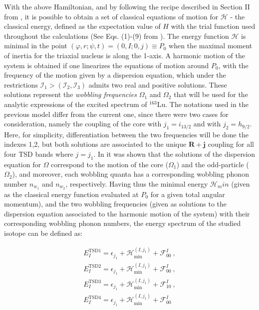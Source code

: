 \documentclass[%
 reprint,
 amsmath,
 amssymb,
 aps,
 floatfix,
]{revtex4-2}
\begin{document}
With the above Hamiltonian, and by following the recipe described in Section II from \cite{raduta2020new}, it is possible to obtain a set of classical equations of motion for $\mathcal{H}$ - the classical energy, defined as the expectation value of $H$ with the trial function used throughout the calculations (See Eqs. (1)-(9) from \cite{raduta2020new}). The energy function $\mathcal{H}$ is minimal in the point $(\varphi,r;\psi,t)=(0,I;0,j)\equiv P_0$ when the maximal moment of inertia for the triaxial nucleus is along the 1-axis. A harmonic motion of the system is obtained if one linearizes the equations of motion around $P_0$, with the frequency of the motion given by a dispersion equation, which under the restrictions $\mathcal{I}_1>(\mathcal{I}_2,\mathcal{I_3})$ admits two real and positive solutions. These solutions represent the \emph{wobbling frequencies} $\Omega_1$ and $\Omega_2$ that will be used for the analytic expressions of the excited spectrum of $^{163}$Lu. The notations used in the previous model differ from the current one, since there were two cases for consideration, namely the coupling of the core with $j_1=i_{13/2}$ and with $j_2=h_{9/2}$. Here, for simplicity, differentiation between the two frequencies will be done the indexes 1,2, but both solutions are associated to the unique $\mathbf{R}+\mathbf{j}$ coupling for all four TSD bands where $j=j_1$. In \cite{raduta2017semiclassical} it was shown that the solutions of the dispersion equation for $\Omega$ correspond to the motion of the core ($\Omega_1$) and the odd-particle ($\Omega_2$), and moreover, each wobbling quanta has a corresponding wobbling phonon number $n_{w_1}$ and $n_{w_2}$, respectively. Having thus the minimal energy $\mathcal{H}_min$ (given as the classical energy function evaluated at $P_0$ for a given total angular momentum), and the two wobbling frequencies (given as solutions to the dispersion equation associated to the harmonic motion of the system) with their corresponding wobbling phonon numbers, the energy spectrum of the studied isotope can be defined as:

\begin{align}
    E_I^\text{TSD1}=\epsilon_{j_1} + \mathcal{H}_\text{min}^{(I,j_1)}+\mathcal{F}_{00}^I \nonumber\ ,\\
    E_I^\text{TSD2}=\epsilon_{j_1} + \mathcal{H}_\text{min}^{(I,j_1)}+\mathcal{F}_{00}^I \nonumber\ ,\\
    E_I^\text{TSD3}=\epsilon_{j_1} + \mathcal{H}_\text{min}^{(I,j_1)}+\mathcal{F}_{10}^I \nonumber\ ,\\
    E_I^\text{TSD4}=\epsilon_{j_1} + \mathcal{H}_\text{min}^{(I,j_1)}+\mathcal{F}_{00}^I \label{wobbling_energies}
\end{align}
\end{document}
